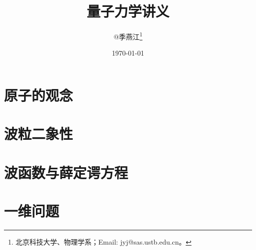\documentclass[twoside,b5paper,11pt]{book}
\begin{document}
\pagestyle{headings}


\title{量子力学讲义}
\author {@季燕江\footnote{北京科技大学、物理学系；Email: jyj@sas.ustb.edu.cn。}}




\date{\today}

\maketitle



%


%




\tableofcontents \setcounter{tocdepth}{2}


\newpage

\chapter{原子的观念}







\chapter{波粒二象性}









\chapter{波函数与薛定谔方程}







\chapter{一维问题}
\end{document}
